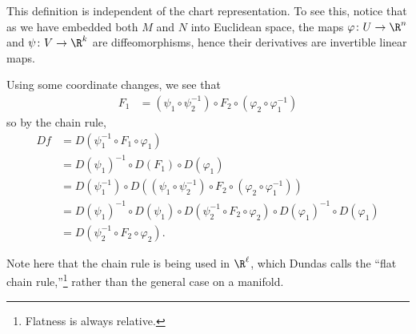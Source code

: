 \documentclass[10pt]{mypackage}
\renewcommand*{\mathbb}[1]{\varmathbb{#1}}
\begin{document}
\begin{remark}
  This definition is independent of the chart representation. To see this, notice that as we have embedded both $M$ and $N$ into Euclidean space, the maps $\varphi\colon U\rightarrow \R^{n}$ and $\psi\colon V\rightarrow \R^{k}$ are diffeomorphisms, hence their derivatives are invertible linear maps.
  \begin{center}
  \end{center}
  Using some coordinate changes, we see that
  \begin{align*}
    F_1 &= \left( \psi_1\circ \psi_2^{-1} \right)\circ F_2\circ\left( \varphi_2\circ \varphi_1^{-1} \right)
  \end{align*}
  so by the chain rule,
  \begin{align*}
    Df &= D\left( \psi_1^{-1}\circ F_1\circ \varphi_1 \right)\\
       &= D\left( \psi_1 \right)^{-1}\circ D\left( F_1 \right)\circ D\left( \varphi_1 \right)\\
       &= D\left( \psi_1^{-1} \right)\circ D\left( \left( \psi_1\circ \psi_2^{-1} \right)\circ F_2\circ \left( \varphi_2\circ \varphi_1^{-1} \right) \right)\\
       &= D\left( \psi_1 \right)^{-1}\circ D\left( \psi_1 \right)\circ D\left( \psi_2^{-1}\circ F_2\circ \varphi_2 \right)\circ D\left( \varphi_1 \right)^{-1}\circ D\left( \varphi_1 \right)\\
       &= D\left( \psi_2^{-1}\circ F_2\circ \varphi_2 \right).
  \end{align*}
\end{remark}
Note here that the chain rule is being used in $\R^{\ell}$, which Dundas calls the ``flat chain rule,''\footnote{Flatness is always relative.} rather than the general case on a manifold.\newline
\end{document}
